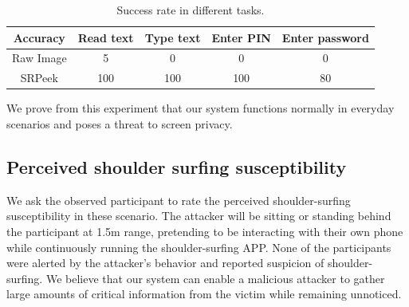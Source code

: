 \begin{table}[!t]
\centering
\begin{tabular}{@{}ccccc@{}}
	\toprule
Accuracy & Read text & Type text & Enter PIN & Enter password\\ \midrule
Raw Image & 5 & 0 & 0 & 0\\
SRPeek & 100 & 100 & 100 & 80\\ \bottomrule
\end{tabular}
\caption{Success rate in different tasks.}
\label{table-task}
\end{table}

We prove from this experiment that our system functions normally in everyday scenarios and poses a threat to screen privacy.

\subsection{Perceived shoulder surfing susceptibility}
We ask the observed participant to rate the perceived shoulder-surfing susceptibility in these scenario. The attacker will be sitting or standing behind the participant at 1.5m range, pretending to be interacting with their own phone while continuously running the shoulder-surfing APP. None of the participants were alerted by the attacker's behavior and reported suspicion of shoulder-surfing. We believe that our system can enable a malicious attacker to gather large amounts of critical information from the victim while remaining unnoticed.





